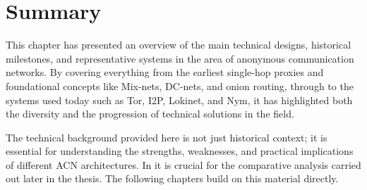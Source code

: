 \section{Summary}
This chapter has presented an overview of the main technical designs, historical milestones, and representative systems in the area of anonymous communication networks. By covering everything from the earliest single-hop proxies and foundational concepts like Mix-nets, DC-nets, and onion routing, through to the systems used today such as Tor, I2P, Lokinet, and Nym, it has highlighted both the diversity and the progression of technical solutions in the field.

The technical background provided here is not just historical context; it is essential for understanding the strengths, weaknesses, and practical implications of different ACN architectures. In it is crucial for the comparative analysis carried out later in the thesis.  The following chapters build on this material directly.
